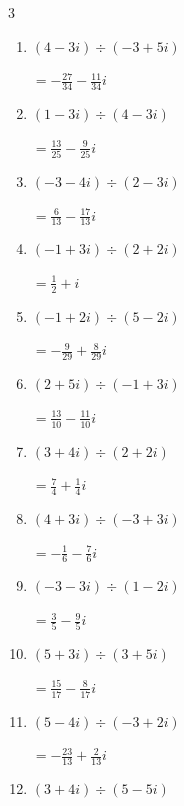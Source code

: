 \begin{multicols}{3}
\begin{enumerate}
        $\displaystyle =\frac{7}{10}-\frac{11}{10}i$

  \item $\displaystyle (4-3i)\div(-3+5i)$

        $\displaystyle =-\frac{27}{34}-\frac{11}{34}i$

  \item $\displaystyle (1-3i)\div(4-3i)$

        $\displaystyle =\frac{13}{25}-\frac{9}{25}i$

\columnbreak %

  \item $\displaystyle (-3-4i)\div(2-3i)$

        $\displaystyle =\frac{6}{13}-\frac{17}{13}i$

  \item $\displaystyle (-1+3i)\div(2+2i)$

        $\displaystyle =\frac{1}{2}+i$

  \item $\displaystyle (-1+2i)\div(5-2i)$

        $\displaystyle =-\frac{9}{29}+\frac{8}{29}i$

  \item $\displaystyle (2+5i)\div(-1+3i)$

        $\displaystyle =\frac{13}{10}-\frac{11}{10}i$

  \item $\displaystyle (3+4i)\div(2+2i)$

        $\displaystyle =\frac{7}{4}+\frac{1}{4}i$

  \item $\displaystyle (4+3i)\div(-3+3i)$

        $\displaystyle =-\frac{1}{6}-\frac{7}{6}i$

  \item $\displaystyle (-3-3i)\div(1-2i)$

        $\displaystyle =\frac{3}{5}-\frac{9}{5}i$

  \item $\displaystyle (5+3i)\div(3+5i)$

        $\displaystyle =\frac{15}{17}-\frac{8}{17}i$

  \item $\displaystyle (5-4i)\div(-3+2i)$

        $\displaystyle =-\frac{23}{13}+\frac{2}{13}i$

  \item $\displaystyle (3+4i)\div(5-5i)$


\end{enumerate}
\end{multicols}

